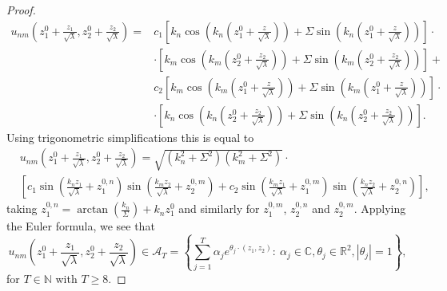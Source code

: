 \documentclass{amsart}
\theoremstyle{definition}
\theoremstyle{remark}
\renewcommand\geq\geqslant
\numberwithin{equation}{section}
\theoremstyle{definition}
\theoremstyle{remark}
\begin{document}
\begin{proof}
	\begin{equation}
		\begin{aligned}
			u_{nm}\left(z_1^0+\frac{z_1}{\sqrt{\lambda}},z_2^0+\frac{z_2}{\sqrt{\lambda}}\right)=&c_1\left[k_n\cos\left(k_n\left(z_1^0+\frac{z}{\sqrt{\lambda}}\right)\right)+\Sigma\sin\left(k_n\left(z_1^0+\frac{z}{\sqrt{\lambda}}\right)\right)\right]\cdot\\&\cdot \left[k_m\cos\left(k_m\left(z_2^0+\frac{z_2}{\sqrt{\lambda}}\right)\right)+\Sigma\sin\left(k_m\left(z_2^0+\frac{z_2}{\sqrt{\lambda}}\right)\right)\right]+\\&c_2\left[k_m\cos\left(k_m\left(z_1^0+\frac{z}{\sqrt{\lambda}}\right)\right)+\Sigma\sin\left(k_m\left(z_1^0+\frac{z}{\sqrt{\lambda}}\right)\right)\right]\cdot\\&\cdot \left[k_n\cos\left(k_n\left(z_2^0+\frac{z_2}{\sqrt{\lambda}}\right)\right)+\Sigma\sin\left(k_n\left(z_2^0+\frac{z_2}{\sqrt{\lambda}}\right)\right)\right].
		\end{aligned}
	\end{equation} Using trigonometric simplifications this is equal to 
	\begin{equation}
		\begin{aligned}
			&	u_{nm}\left(z_1^0+\frac{z_1}{\sqrt{\lambda}},z_2^0+\frac{z_2}{\sqrt{\lambda}}\right)=\sqrt{\left(k_n^2+\Sigma^2\right)\left(k_m^2+\Sigma^2\right)}\cdot\\&\left[c_1\sin\left(\frac{k_nz_1}{\sqrt{\lambda}}+z_1^{0,n}\right)\sin\left(\frac{k_mz_2}{\sqrt{\lambda}}+z_2^{0,m}\right)\right.+\left.c_2\sin\left(\frac{k_mz_1}{\sqrt{\lambda}}+z_1^{0,m}\right)\sin\left(\frac{k_nz_2}{\sqrt{\lambda}}+z_2^{0,n}\right)\right],
		\end{aligned}
	\end{equation}
	taking $z_1^{0,n}=\arctan\left(\frac{k_n}{\Sigma}\right)+k_nz_1^0$ and similarly for $z_1^{0,m}$, $z_2^{0,n}$ and $z_2^{0,m}$. Applying the Euler formula, we see that \begin{equation}
		u_{nm}\left(z_1^0+\frac{z_1}{\sqrt{\lambda}},z_2^0+\frac{z_2}{\sqrt{\lambda}}\right)\in \mathcal{A}_T=\left\{\sum_{j=1}^T\alpha_je^{\theta_j\cdot(z_1,z_2)}:\ \alpha_j\in\mathbb{C}, \theta_j\in\mathbb{R}^2,|\theta_j|=1\right\},
	\end{equation} for $T\in\mathbb{N}$ with $T\geq 8$.	
	

\end{proof}
\end{document}
